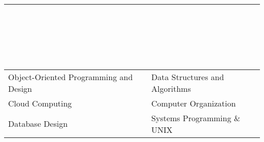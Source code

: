\documentclass[10pt]{book}
\begin{document}
{\begin{spacing}{0.2}
{                \\
            }
            \rule{\linewidth}{0.4pt}
            \\
            \\
            \\
            \\
            \\
        \end{spacing}
        \noindent
        \begin{tabular}{p{} p{}}
            Object-Oriented Programming and Design & Data Structures and Algorithms \\
            Cloud Computing & Computer Organization \\
            Database Design & Systems Programming \& UNIX \\
        \end{tabular}
    }
\end{document}
